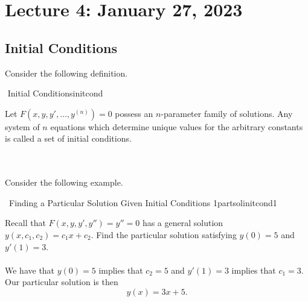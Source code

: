 \section{Lecture 4: January 27, 2023}

    \subsection{Initial Conditions}

        Consider the following definition.
        \begin{definition}{\Stop\,\,Initial Conditions}{initcond}

            Let \(F(x,y,y',\ldots,y^{(n)})=0\) possess an \(n\)-parameter family of solutions. Any system of \(n\) equations which determine unique values for the arbitrary constants is called a set of initial conditions.
            
        \end{definition}
        \vphantom
        \\
        \\
        Consider the following example.
        \begin{example}{\Difficulty\,\Difficulty\,\,Finding a Particular Solution Given Initial Conditions 1}{partsolinitcond1}

            Recall that \(F(x,y,y',y'')=y''=0\) has a general solution \(y(x,c_1,c_2)=c_1x+c_2\). Find the particular solution satisfying \(y(0)=5\) and \(y'(1)=3\).
            \\
            \\
            We have that \(y(0)=5\) implies that \(c_2=5\) and \(y'(1)=3\) implies that \(c_1=3\). Our particular solution is then
            \begin{equation*}
                y(x)=3x+5.
            \end{equation*}
            
        \end{example}

